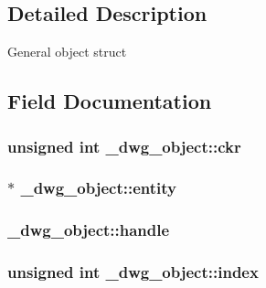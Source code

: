 \subsection{\-Detailed \-Description}
\-General object struct 

\subsection{\-Field \-Documentation}
\hypertarget{struct__dwg__object_a6bb160ffa5f4acf4f8866132a93659e5}{
\subsubsection[{ckr}]{\setlength{\rightskip}{0pt plus 5cm}unsigned int {\bf \-\_\-dwg\-\_\-object\-::ckr}}}\label{struct__dwg__object_a6bb160ffa5f4acf4f8866132a93659e5}
\hypertarget{struct__dwg__object_a561b7406253ad9b43715956b01cf7f47}{
\subsubsection[{entity}]{$\ast$ {\bf \-\_\-dwg\-\_\-object\-::entity}}}\label{struct__dwg__object_a561b7406253ad9b43715956b01cf7f47}
\hypertarget{struct__dwg__object_a70641bb58921286a37ff692a6f674792}{
\subsubsection[{handle}]{ {\bf \-\_\-dwg\-\_\-object\-::handle}}}\label{struct__dwg__object_a70641bb58921286a37ff692a6f674792}
\hypertarget{struct__dwg__object_a40fb9343223fe3655090c04899971854}{
\subsubsection[{index}]{\setlength{\rightskip}{0pt plus 5cm}unsigned int {\bf \-\_\-dwg\-\_\-object\-::index}}}\label{struct__dwg__object_a40fb9343223fe3655090c04899971854}
